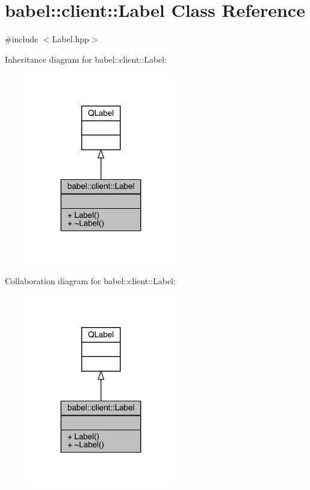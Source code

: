 \hypertarget{classbabel_1_1client_1_1_label}{}\section{babel\+:\+:client\+:\+:Label Class Reference}
\label{classbabel_1_1client_1_1_label}


{\ttfamily \#include $<$Label.\+hpp$>$}



Inheritance diagram for babel\+:\+:client\+:\+:Label\+:\nopagebreak
\begin{figure}[H]
\begin{center}
\leavevmode
\includegraphics[width=179pt]{classbabel_1_1client_1_1_label__inherit__graph}
\end{center}
\end{figure}


Collaboration diagram for babel\+:\+:client\+:\+:Label\+:\nopagebreak
\begin{figure}[H]
\begin{center}
\leavevmode
\includegraphics[width=179pt]{classbabel_1_1client_1_1_label__coll__graph}
\end{center}
\end{figure}
